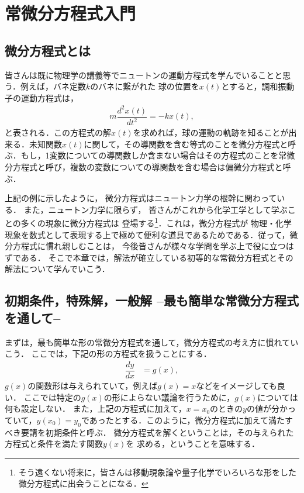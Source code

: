 \chapter{常微分方程式入門}
\section{微分方程式とは}
%
皆さんは既に物理学の講義等でニュートンの運動方程式を学んでいることと思う．例えば，バネ定数$k$のバネに繋がれた
球の位置を$x(t)$とすると，調和振動子の運動方程式は，
\begin{align}
  m\dfrac{d^2 x(t)}{dt^2} = -kx\left(t\right), 
\end{align}
と表される．この方程式の解$x(t)$を求めれば，球の運動の軌跡を知ることが出来る．未知関数$x\left(t\right)$に関して，その導関数を含む等式のことを微分方程式と呼ぶ．もし，1変数についての導関数しか含まない場合はその方程式のことを常微分方程式と呼び，複数の変数についての導関数を含む場合は偏微分方程式と呼ぶ．

上記の例に示したように，
微分方程式はニュートン力学の根幹に関わっている．
また，ニュートン力学に限らず，
皆さんがこれから化学工学として学ぶことの多くの現象に微分方程式は
登場する\footnote{そう遠くない将来に，皆さんは移動現象論や量子化学でいろいろな形をした微分方程式に出会うことになる．}．これは，微分方程式が
物理・化学現象を数式として表現する上で極めて便利な道具であるためである．従って，微分方程式に慣れ親しむことは，
今後皆さんが様々な学問を学ぶ上で役に立つはずである．
そこで本章では，解法が確立している初等的な常微分方程式とその解法について学んでいこう．

%
\section{初期条件，特殊解，一般解 –最も簡単な常微分方程式を通して–}
まずは，最も簡単な形の常微分方程式を通して，微分方程式の考え方に慣れていこう．
ここでは，下記の形の方程式を扱うことにする．
\begin{align}
 \dfrac{dy}{dx} &= g(x), \label{eq:PDE_01} 
\end{align}
$g(x)$の関数形は与えられていて，例えば$g(x) = x$などをイメージしても良い．
ここでは特定の$g(x)$の形によらない議論を行うために，$g(x)$については何も設定しない．
また，上記の方程式に加えて，$x = x_0$のときの$y$の値が分かっていて，$y\left(x_0\right) = y_{0}$であったとする．このように，微分方程式に加えて満たすべき要請を初期条件と呼ぶ．
微分方程式を解くということは，その与えられた方程式と条件を満たす関数$y\left(x\right)$を
求める，ということを意味する．

